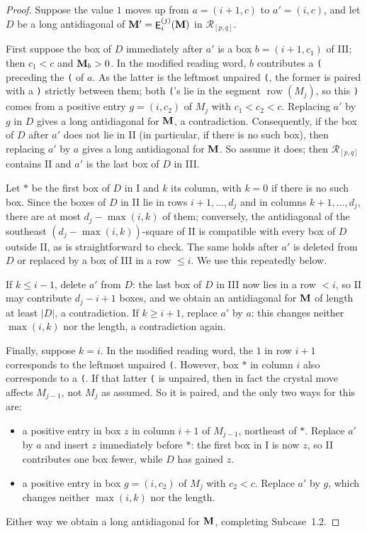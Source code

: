 \documentclass[12pt]{amsart}
\DeclareMathOperator{\mate}{\sf E}
\theoremstyle{definition}
\theoremstyle{remark}
\begin{document}
\begin{proof}
Suppose the value $1$ moves up from $a=(i+1,c)$ to $a'=(i,c)$, and let $D$ be a long
antidiagonal of ${\bf M}'=\mate_i^{(j)}({\bf M})$ in ${\mathcal R}_{[p,q]}$.

First suppose the box of $D$ immediately after $a'$ is a box $b=(i+1,c_1)$ of III; then
$c_1<c$ and ${\bf M}_b>0$. In the modified reading word, $b$ contributes a {\tt (}
preceding the {\tt (} of $a$. As the latter is the leftmost unpaired {\tt (}, the former is
paired with a {\tt )} strictly between them; both {\tt (}'s lie in the segment
$\operatorname{row}(M_j)$, so this {\tt )} comes from a positive entry $g=(i,c_2)$ of $M_j$
with $c_1<c_2<c$. Replacing $a'$ by $g$ in $D$ gives a long antidiagonal for ${\bf M}$, a
contradiction. Consequently, if the box of $D$ after $a'$ does not lie in II (in
particular, if there is no such box), then replacing $a'$ by $a$ gives a long antidiagonal
for ${\bf M}$. So assume it does; then ${\mathcal R}_{[p,q]}$ contains II and $a'$ is the
last box of $D$ in III.

Let $\ast$ be the first box of $D$ in I and $k$ its column, with $k=0$ if there is no such
box. Since the boxes of $D$ in II lie in rows $i+1,\ldots,d_j$ and in columns
$k+1,\ldots,d_j$, there are at most $d_j-\max(i,k)$ of them; conversely, the antidiagonal
of the southeast $(d_j-\max(i,k))$-square of II is compatible with every box of $D$ outside
II, as is straightforward to check. The same holds after $a'$ is deleted from $D$ or
replaced by a box of III in a row $\le i$. We use this repeatedly below.

If $k\le i-1$, delete $a'$ from $D$: the last box of $D$ in III now lies in a row $<i$, so
II may contribute $d_j-i+1$ boxes, and we obtain an antidiagonal for ${\bf M}$ of length at
least $|D|$, a contradiction. If $k\ge i+1$, replace $a'$ by $a$: this changes neither
$\max(i,k)$ nor the length, a contradiction again.

Finally, suppose $k=i$. In the modified reading word, the $1$ in row $i+1$ corresponds to
the leftmost unpaired {\tt (}. However, box $\ast$ in column $i$ also corresponds to a {\tt (}.
If that latter {\tt (} is unpaired, then in fact the crystal move affects $M_{j-1}$, not
$M_j$ as assumed. So it is paired, and the only two ways for this are:
\begin{itemize}
\item[(1)] a positive entry in box $z$ in column $i+1$ of $M_{j-1}$, northeast of $\ast$. Replace
$a'$ by $a$ and insert $z$ immediately before $\ast$: the first box in I is now $z$, so II
contributes one box fewer, while $D$ has gained $z$.
\item[(2)] a positive entry in box $g=(i,c_2)$ of $M_j$ with $c_2<c$. Replace $a'$ by $g$, which
changes neither $\max(i,k)$ nor the length.
\end{itemize}
Either way we obtain a long antidiagonal for ${\bf M}$, completing Subcase~1.2.


\end{proof}
\end{document}
